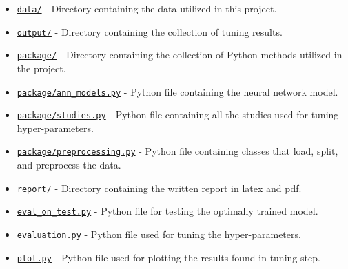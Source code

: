 \begin{itemize}
\item \href{https://github.uio.no/fabior/IN5550/tree/master/Oblig1/data}{\texttt{data/}} - Directory containing the data utilized in this project.

\item \href{https://github.uio.no/fabior/IN5550/tree/master/Oblig1/packages}{\texttt{output/}} - Directory containing the collection of tuning results.

\item \href{https://github.uio.no/fabior/IN5550/tree/master/Oblig1/packages}{\texttt{package/}} - Directory containing the collection of Python methods utilized in the project.

\item \href{https://github.uio.no/fabior/IN5550/tree/master/Oblig1/packages/ann_models.py}{\texttt{package/ann\_models.py}} - Python file containing the neural network model.

\item \href{https://github.uio.no/fabior/IN5550/tree/master/Oblig1/packages/studies.py}{\texttt{package/studies.py}} - Python file containing all the studies used for tuning hyper-parameters.

\item \href{https://github.uio.no/fabior/IN5550/tree/master/Oblig1/packages/preprocessing.py}{\texttt{package/preprocessing.py}} - Python file containing classes that load, split, and preprocess the data.

\item \href{https://github.uio.no/fabior/IN5550/tree/master/Oblig1/report}{\texttt{report/}} - Directory containing the written report in latex and pdf.

\item \href{https://github.uio.no/fabior/IN5550/blob/master/Oblig1/eval_on_test.py}{\texttt{eval\_on\_test.py}} - Python file for testing the optimally trained model.

\item \href{https://github.uio.no/fabior/IN5550/blob/master/Oblig1/evaluation.py}{\texttt{evaluation.py}} - Python file used for tuning the hyper-parameters.

\item \href{https://github.uio.no/fabior/IN5550/blob/master/Oblig1/plot.py}{\texttt{plot.py}} - Python file used for plotting the results found in tuning step.
\end{itemize}